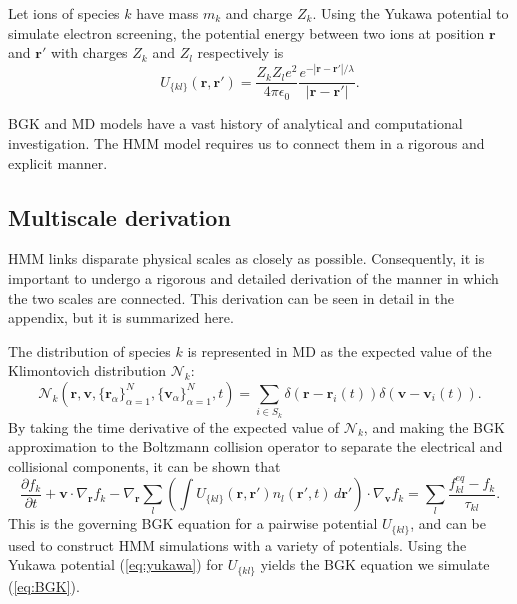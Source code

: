 \documentclass{article}
\begin{document}
 Let ions of species $k$ have mass $m_k$ and charge $Z_k$. Using the Yukawa potential to simulate electron screening, the potential energy between two ions at position $\mathbf{r}$ and $\mathbf{r}'$ with charges $Z_k$ and $Z_l$ respectively is
\begin{equation}U_{\{kl\}}(\mathbf{r},\mathbf{r}')=\frac{Z_kZ_le^2}{4\pi\epsilon_0}\frac{e^{-|\mathbf{r}-\mathbf{r}'|/\lambda}}{|\mathbf{r}-\mathbf{r}'|}.\label{eq:yukawa}
\end{equation}

BGK and MD models have a vast history of analytical and computational investigation. The HMM model requires us to connect them in a rigorous and explicit manner.





\subsection{Multiscale derivation}

HMM links disparate physical scales as closely as possible. Consequently, it is important to undergo a rigorous and detailed derivation of the manner in which the two scales are connected. This derivation can be seen in detail in the appendix, but it is summarized here.

The distribution of species $k$ is represented in MD as the expected value of the Klimontovich distribution $\mathcal{N}_k$:
\begin{equation}
\mathcal{N}_k(\mathbf{r},\mathbf{v},\{\mathbf{r}_\alpha\}_{\alpha=1}^{N},\{\mathbf{v}_\alpha\}_{\alpha=1}^{N},t)=\sum_{i\in S_k}\delta\left(\mathbf{r}-\mathbf{r}_i(t)\right)\delta\left(\mathbf{v}-\mathbf{v}_i(t)\right).
\end{equation}By taking the time derivative of the expected value of $\mathcal{N}_k$, and making the BGK approximation to the Boltzmann collision operator to separate the electrical and collisional components, it can be shown that
\[\frac{\partial f_k}{\partial t}+\mathbf{v}\cdot \nabla_\mathbf{r}f_k-\nabla_\mathbf{r}\sum_l\left(\int U_{\{kl\}}(\mathbf{r},\mathbf{r}')n_l(\mathbf{r}',t)\,d\mathbf{r}'\right)\cdot \nabla_\mathbf{v}f_k=\sum_l\frac{f_{kl}^{eq}-f_k}{\tau_{kl}}.
\]This is the governing BGK equation for a pairwise potential $U_{\{kl\}}$, and can be used to construct HMM simulations with a variety of potentials. Using the Yukawa potential (\ref{eq:yukawa}) for $U_{\{kl\}}$ yields the BGK equation we simulate (\ref{eq:BGK}).
\end{document}
